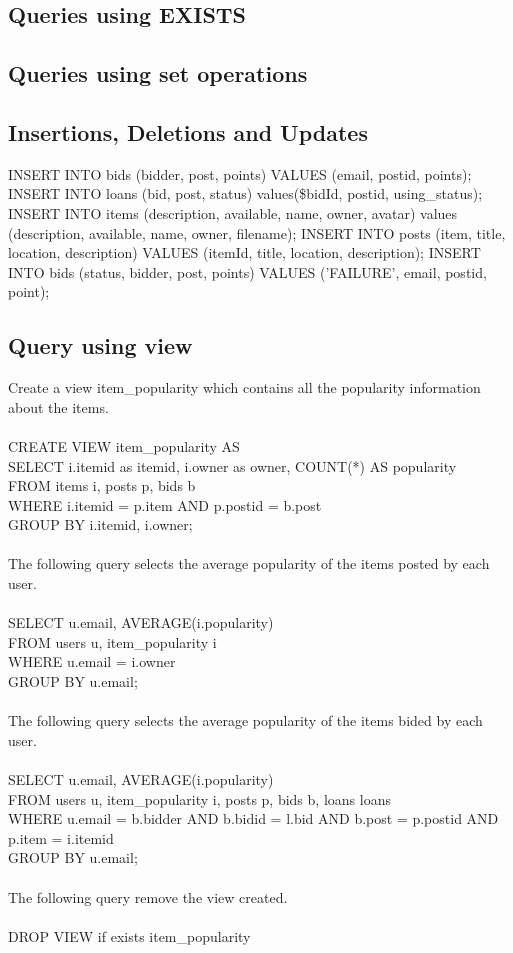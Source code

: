 \subsection{Queries using EXISTS}

\subsection{Queries using set operations}

\subsection{Insertions, Deletions and Updates}
INSERT INTO bids (bidder, post, points) VALUES (email, postid, points);
INSERT INTO loans (bid, post, status) values(\$bidId, postid, using\_status);
INSERT INTO items (description, available, name, owner, avatar) values (description,
                   available, name, owner, filename);
INSERT INTO posts (item, title, location, description) VALUES (itemId, title, location, description);
INSERT INTO bids (status, bidder, post, points) VALUES ('FAILURE', email, postid, point);

\subsection{Query using view}
Create a view item\_popularity which contains all the popularity information about the items.\\\\
CREATE VIEW item\_popularity AS\\
SELECT i.itemid as itemid, i.owner as owner, COUNT(*) AS popularity\\
FROM items i, posts p, bids b\\
WHERE i.itemid = p.item AND p.postid = b.post\\
GROUP BY i.itemid, i.owner;\\\\
The following query selects the average popularity of the items posted by each user.\\\\
SELECT u.email, AVERAGE(i.popularity)\\
FROM users u, item\_popularity i\\
WHERE u.email = i.owner\\
GROUP BY u.email;\\\\
The following query selects the average popularity of the items bided by each user.\\\\
SELECT u.email, AVERAGE(i.popularity)\\
FROM users u, item\_popularity i, posts p, bids b, loans loans\\
WHERE u.email = b.bidder AND b.bidid = l.bid AND b.post = p.postid AND p.item = i.itemid\\
GROUP BY u.email;\\\\
The following query remove the view created.\\\\
DROP VIEW if exists item\_popularity



